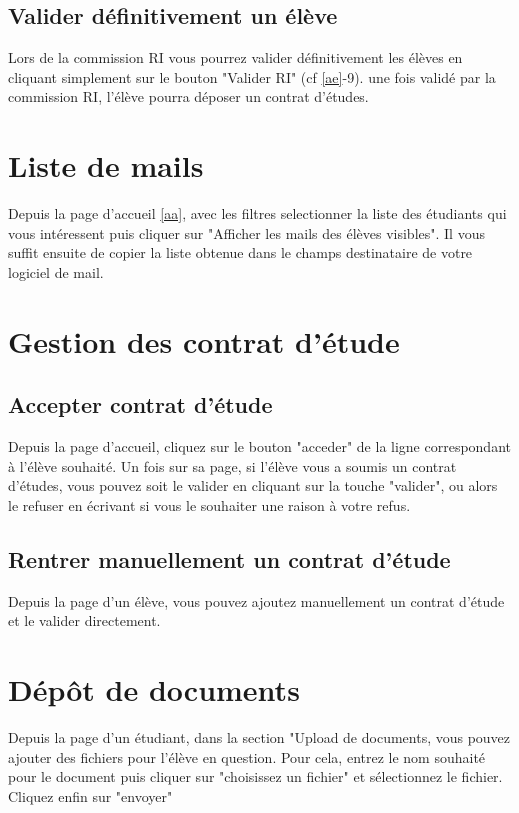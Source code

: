 \subsection{Valider définitivement un élève}
Lors de la commission RI vous pourrez valider définitivement les élèves en cliquant simplement sur le bouton "Valider RI" (cf \ref{ae}-9). une fois validé par la commission RI, l'élève pourra déposer un contrat d'études.

\section{Liste de mails}

Depuis la page d'accueil \ref{aa}, avec les filtres selectionner la liste des étudiants qui vous intéressent puis cliquer sur "Afficher les mails des élèves visibles". Il vous suffit ensuite de copier la liste obtenue dans le champs destinataire de votre logiciel de mail.

\section{Gestion des contrat d'étude}

\subsection{Accepter contrat d'étude}
Depuis la page d'accueil, cliquez sur le bouton "acceder" de la ligne correspondant à l'élève souhaité. Un fois sur sa page, si l'élève vous a soumis un contrat d'études, vous pouvez soit le valider en cliquant sur la touche "valider", ou alors le refuser en écrivant si vous le souhaiter une raison à votre refus.

\subsection{Rentrer manuellement un contrat d'étude}
Depuis la page d'un élève, vous pouvez ajoutez manuellement un contrat d'étude et le valider directement.

\section{Dépôt de documents}

Depuis la page d'un étudiant, dans la section "Upload de documents, vous pouvez ajouter des fichiers pour l'élève en question. Pour cela, entrez le nom souhaité pour le document puis cliquer sur "choisissez un fichier" et sélectionnez le fichier. Cliquez enfin sur "envoyer" 

